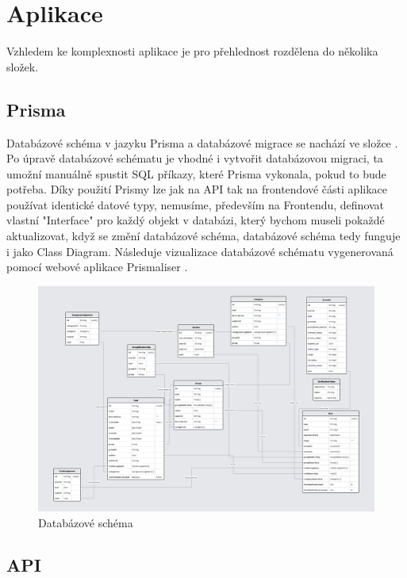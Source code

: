 \chapter{Aplikace}
Vzhledem ke komplexnosti aplikace je pro přehlednost rozdělena do několika složek.
\section{Prisma}
\label{sec:prisma}
Databázové schéma v jazyku Prisma a databázové migrace se nachází ve složce . Po úpravě databázové schématu je vhodné i vytvořit databázovou migraci, ta umožní manuálně spustit SQL příkazy, které Prisma vykonala, pokud to bude potřeba. Díky použití Prismy lze jak na API tak na frontendové části aplikace používat identické datové typy, nemusíme, především na Frontendu, definovat vlastní "Interface" pro každý objekt v databázi, který bychom museli pokaždé aktualizovat, když se změní databázové schéma, databázové schéma tedy funguje i jako Class Diagram.
Následuje vizualizace databázové schématu vygenerovaná pomocí webové aplikace Prismaliser \cite{prismaliser}.

\begin{landscape}
\begin{figure}[hbt]
	\includegraphics[width=1\linewidth]{img/DB_schema.png}
	\caption{Databázové schéma}
\end{figure}
\end{landscape}
\section{API}
\label{sec:api}

